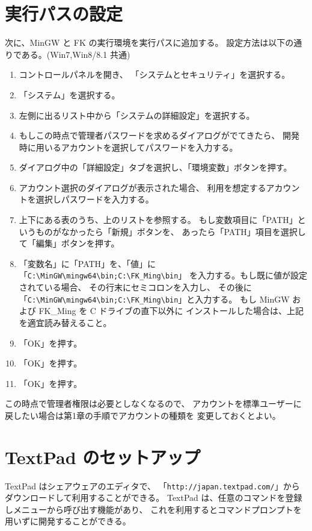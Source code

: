 \documentclass[a4j]{jarticle}
\begin{document}
\section{実行パスの設定}
次に、MinGW と FK の実行環境を実行パスに追加する。
設定方法は以下の通りである。(Win7,Win8/8.1 共通)
\begin{enumerate}
 \item コントロールパネルを開き、
	「システムとセキュリティ」を選択する。
 \item 「システム」を選択する。
 \item 左側に出るリスト中から「システムの詳細設定」を選択する。
 \item もしこの時点で管理者パスワードを求めるダイアログがでてきたら、
	開発時に用いるアカウントを選択してパスワードを入力する。
 \item ダイアログ中の「詳細設定」タブを選択し、「環境変数」ボタンを押す。
 \item アカウント選択のダイアログが表示された場合、
	利用を想定するアカウントを選択しパスワードを入力する。
 \item 上下にある表のうち、上のリストを参照する。
 	もし変数項目に「PATH」というものがなかったら「新規」ボタンを、
 	あったら「PATH」項目を選択して「編集」ボタンを押す。
 \item 「変数名」に「PATH」を、「値」に
	「\verb+C:\MinGW\mingw64\bin;C:\FK_Ming\bin+」
	を入力する。もし既に値が設定されている場合、
	その行末にセミコロンを入力し、
	その後に「\verb+C:\MinGW\mingw64\bin;C:\FK_Ming\bin+」と入力する。
	もし MinGW および FK\_Ming を C ドライブの直下以外に
	インストールした場合は、上記を適宜読み替えること。
 \item 「OK」を押す。
 \item 「OK」を押す。
 \item 「OK」を押す。
\end{enumerate}
この時点で管理者権限は必要としなくなるので、
アカウントを標準ユーザーに戻したい場合は第1章の手順でアカウントの種類を
変更しておくとよい。

\appendix

\section{TextPad のセットアップ}
TextPad はシェアウェアのエディタで、
「\verb+http://japan.textpad.com/+」からダウンロードして利用することができる。
TextPad は、任意のコマンドを登録しメニューから呼び出す機能があり、
これを利用するとコマンドプロンプトを用いずに開発することができる。
\end{document}
